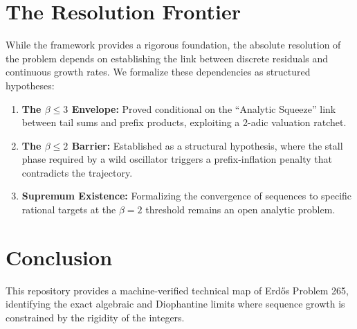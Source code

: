 \documentclass[11pt,a4paper]{article}
\begin{document}
\section{The Resolution Frontier}
While the framework provides a rigorous foundation, the absolute resolution of the problem depends on establishing the link between discrete residuals and continuous growth rates. We formalize these dependencies as structured hypotheses:
\begin{enumerate}
    \item \textbf{The $\beta \le 3$ Envelope:} Proved conditional on the ``Analytic Squeeze'' link between tail sums and prefix products, exploiting a 2-adic valuation ratchet.
    \item \textbf{The $\beta \le 2$ Barrier:} Established as a structural hypothesis, where the stall phase required by a wild oscillator triggers a prefix-inflation penalty that contradicts the trajectory.
    \item \textbf{Supremum Existence:} Formalizing the convergence of sequences to specific rational targets at the $\beta = 2$ threshold remains an open analytic problem.
\end{enumerate}

\section{Conclusion}
This repository provides a machine-verified technical map of Erd\H{o}s Problem 265, identifying the exact algebraic and Diophantine limits where sequence growth is constrained by the rigidity of the integers.
\end{document}
